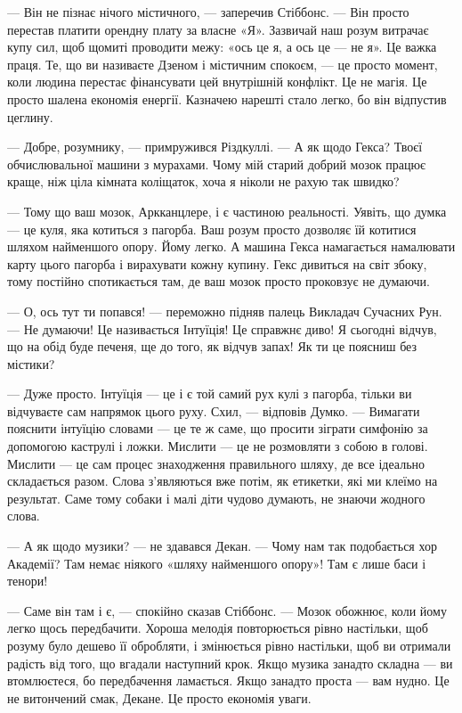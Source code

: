 \documentclass[12pt, a4paper, openany]{book}
\begin{document}
\begin{terrybox}
--- Він не пізнає нічого містичного, --- заперечив Стіббонс. --- Він просто перестав платити орендну плату за власне «Я». Зазвичай наш розум витрачає купу сил, щоб щомиті проводити межу: «ось це я, а ось це --- не я». Це важка праця. Те, що ви називаєте Дзеном і містичним спокоєм, --- це просто момент, коли людина перестає фінансувати цей внутрішній конфлікт. Це не магія. Це просто шалена економія енергії. Казначею нарешті стало легко, бо він відпустив цеглину.

--- Добре, розумнику, --- примружився Різдкуллі. --- А як щодо Гекса? Твоєї обчислювальної машини з мурахами. Чому мій старий добрий мозок працює краще, ніж ціла кімната коліщаток, хоча я ніколи не рахую так швидко?

--- Тому що ваш мозок, Аркканцлере, і є частиною реальності. Уявіть, що думка --- це куля, яка котиться з пагорба. Ваш розум просто дозволяє їй котитися шляхом найменшого опору. Йому легко. А машина Гекса намагається намалювати карту цього пагорба і вирахувати кожну купину. Гекс дивиться на світ збоку, тому постійно спотикається там, де ваш мозок просто проковзує не думаючи.

--- О, ось тут ти попався! --- переможно підняв палець Викладач Сучасних Рун. --- Не думаючи! Це називається Інтуїція! Це справжнє диво! Я сьогодні відчув, що на обід буде печеня, ще до того, як відчув запах! Як ти це поясниш без містики?

--- Дуже просто. Інтуїція --- це і є той самий рух кулі з пагорба, тільки ви відчуваєте сам напрямок цього руху. Схил, --- відповів Думко. --- Вимагати пояснити інтуїцію словами --- це те ж саме, що просити зіграти симфонію за допомогою каструлі і ложки. Мислити --- це не розмовляти з собою в голові. Мислити --- це сам процес знаходження правильного шляху, де все ідеально складається разом. Слова з'являються вже потім, як етикетки, які ми клеїмо на результат. Саме тому собаки і малі діти чудово думають, не знаючи жодного слова.

--- А як щодо музики? --- не здавався Декан. --- Чому нам так подобається хор Академії? Там немає ніякого «шляху найменшого опору»! Там є лише баси і тенори!

--- Саме він там і є, --- спокійно сказав Стіббонс. --- Мозок обожнює, коли йому легко щось передбачити. Хороша мелодія повторюється рівно настільки, щоб розуму було дешево її обробляти, і змінюється рівно настільки, щоб ви отримали радість від того, що вгадали наступний крок. Якщо музика занадто складна --- ви втомлюєтеся, бо передбачення ламається. Якщо занадто проста --- вам нудно. Це не витончений смак, Декане. Це просто економія уваги.


\end{terrybox}
\end{document}
